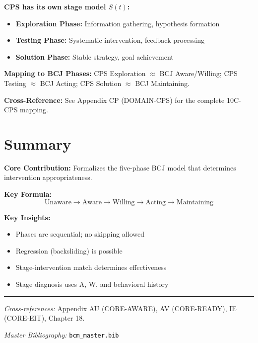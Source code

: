 \begin{tcolorbox}[colback=green!5!white, colframe=green!75!black,
    title=Application Domain: Complex Problem Solving (CP)]
\textbf{CPS has its own stage model $S(t)$:}
\begin{itemize}[nosep]
\item \textbf{Exploration Phase:} Information gathering, hypothesis formation
\item \textbf{Testing Phase:} Systematic intervention, feedback processing
\item \textbf{Solution Phase:} Stable strategy, goal achievement
\end{itemize}

\textbf{Mapping to BCJ Phases:}
CPS Exploration $\approx$ BCJ Aware/Willing; CPS Testing $\approx$ BCJ Acting; CPS Solution $\approx$ BCJ Maintaining.

\textbf{Cross-Reference:} See Appendix CP (DOMAIN-CPS) for the complete 10C-CPS mapping.
\end{tcolorbox}

\section{Summary}

\begin{tcolorbox}[colback=gray!5!white, colframe=gray!75!black,
    title=Appendix AW Summary: CORE-STAGE]

\textbf{Core Contribution:}
Formalizes the five-phase BCJ model that determines intervention appropriateness.

\textbf{Key Formula:}
\begin{equation}
\text{Unaware} \to \text{Aware} \to \text{Willing} \to \text{Acting} \to \text{Maintaining}
\end{equation}

\textbf{Key Insights:}
\begin{itemize}[nosep]
\item Phases are sequential; no skipping allowed
\item Regression (backsliding) is possible
\item Stage-intervention match determines effectiveness
\item Stage diagnosis uses A, W, and behavioral history
\end{itemize}

\end{tcolorbox}

\vspace{1em}
\hrule
\vspace{0.5em}

\noindent\textit{Cross-references:}
Appendix AU (CORE-AWARE), AV (CORE-READY), IE (CORE-EIT), Chapter 18.

\noindent\textit{Master Bibliography:} \texttt{bcm\_master.bib}

\nocite{bcm_master}

